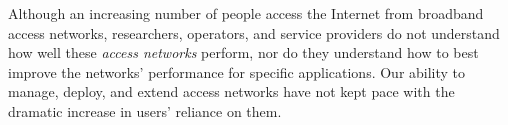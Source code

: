 \begin{center}
{\large \bf \TITLE}
\end{center}

Although an increasing number of people access the Internet from
broadband access networks, researchers, operators, and service
providers do not understand how well these \textit{access networks}
perform, nor do they understand how to best improve the networks'
performance for specific applications.  Our ability to manage, deploy,
and extend access networks have not kept pace with the dramatic increase
in users' reliance on them.



